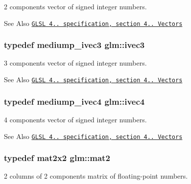 2 components vector of signed integer numbers. 

\begin{DoxySeeAlso}{See Also}
\href{http://www.opengl.org/registry/doc/GLSLangSpec.4.20.8.pdf}{\tt G\-L\-S\-L 4.. specification, section 4.. Vectors} 
\end{DoxySeeAlso}
\hypertarget{group__core__types_ga620442eba2e3b49317b24fd6d141b0f8}{
\subsubsection[{ivec3}]{\setlength{\rightskip}{0pt plus 5cm}typedef mediump\-\_\-ivec3 {\bf glm\-::ivec3}}}\label{group__core__types_ga620442eba2e3b49317b24fd6d141b0f8}


3 components vector of signed integer numbers. 

\begin{DoxySeeAlso}{See Also}
\href{http://www.opengl.org/registry/doc/GLSLangSpec.4.20.8.pdf}{\tt G\-L\-S\-L 4.. specification, section 4.. Vectors} 
\end{DoxySeeAlso}
\hypertarget{group__core__types_ga997dbad029105eea19ccd8a1455a6fe3}{
\subsubsection[{ivec4}]{\setlength{\rightskip}{0pt plus 5cm}typedef mediump\-\_\-ivec4 {\bf glm\-::ivec4}}}\label{group__core__types_ga997dbad029105eea19ccd8a1455a6fe3}


4 components vector of signed integer numbers. 

\begin{DoxySeeAlso}{See Also}
\href{http://www.opengl.org/registry/doc/GLSLangSpec.4.20.8.pdf}{\tt G\-L\-S\-L 4.. specification, section 4.. Vectors} 
\end{DoxySeeAlso}
\hypertarget{group__core__types_ga8357ec0aab6f8cf69313592492663c3f}{
\subsubsection[{mat2}]{\setlength{\rightskip}{0pt plus 5cm}typedef mat2x2 {\bf glm\-::mat2}}}\label{group__core__types_ga8357ec0aab6f8cf69313592492663c3f}


2 columns of 2 components matrix of floating-\/point numbers. 

